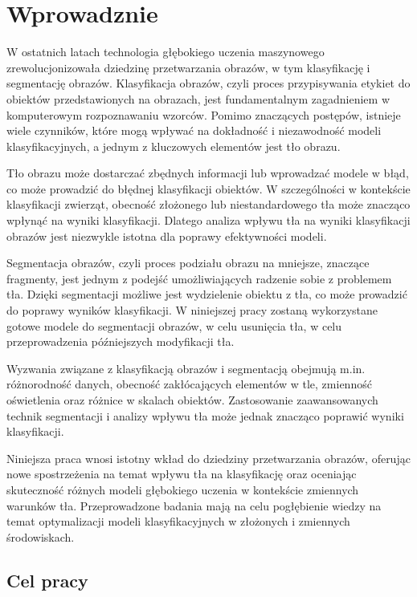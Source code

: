 
\chapter*{Wprowadznie}

W ostatnich latach technologia głębokiego uczenia maszynowego zrewolucjonizowała dziedzinę
przetwarzania obrazów, w tym klasyfikację i segmentację obrazów. Klasyfikacja obrazów, 
czyli proces przypisywania etykiet do obiektów przedstawionych na obrazach, jest fundamentalnym
zagadnieniem w komputerowym rozpoznawaniu wzorców. Pomimo znaczących postępów, istnieje wiele 
czynników, które mogą wpływać na dokładność i niezawodność modeli klasyfikacyjnych, a jednym z 
kluczowych elementów jest tło obrazu.

Tło obrazu może dostarczać zbędnych informacji lub wprowadzać modele w błąd, co może prowadzić 
do błędnej klasyfikacji obiektów. W szczególności w kontekście klasyfikacji zwierząt, obecność 
złożonego lub niestandardowego tła może znacząco wpłynąć na wyniki klasyfikacji. Dlatego analiza 
wpływu tła na wyniki klasyfikacji obrazów jest niezwykle istotna dla poprawy efektywności modeli.

Segmentacja obrazów, czyli proces podziału obrazu na mniejsze, znaczące fragmenty, jest jednym z 
podejść umożliwiających radzenie sobie z problemem tła. Dzięki segmentacji możliwe jest wydzielenie 
obiektu z tła, co może prowadzić do poprawy wyników klasyfikacji. W niniejszej pracy zostaną 
wykorzystane gotowe modele do segmentacji obrazów, w celu usunięcia tła, w celu przeprowadzenia 
późniejszych modyfikacji tła.

Wyzwania związane z klasyfikacją obrazów i segmentacją obejmują m.in. różnorodność danych, 
obecność zakłócających elementów w tle, zmienność oświetlenia oraz różnice w skalach obiektów. 
Zastosowanie zaawansowanych technik segmentacji i analizy wpływu tła może jednak znacząco poprawić
wyniki klasyfikacji.

Niniejsza praca wnosi istotny wkład do dziedziny przetwarzania obrazów, oferując nowe spostrzeżenia
na temat wpływu tła na klasyfikację oraz oceniając skuteczność różnych modeli głębokiego uczenia w 
kontekście zmiennych warunków tła. Przeprowadzone badania mają na celu pogłębienie wiedzy na temat 
optymalizacji modeli klasyfikacyjnych w złożonych i zmiennych środowiskach.

\section*{Cel pracy}


